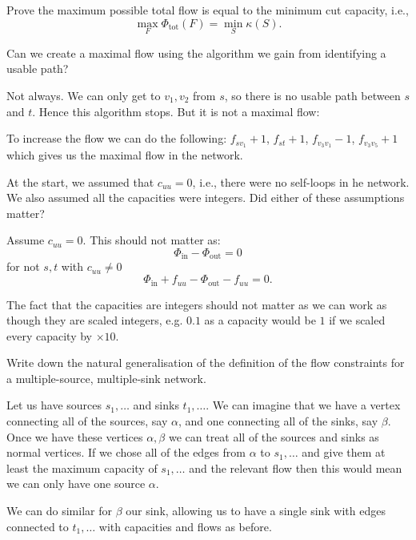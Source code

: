 \documentclass[10pt, a4paper]{article}
\begin{document}
\begin{example}
    Prove the maximum possible total flow is equal to the minimum cut capacity,
    i.e.,
    \[
    \max_{F}\Phi_{\text{tot}}(F) = \min_{S}\kappa(S).
    \]
\end{example}

\begin{example}
    Can we create a maximal flow using the algorithm we gain from identifying a usable path?

    \begin{solution}
        Not always.
        We can only get to $v_1, v_2$ from $s$,
        so there is no usable path between $s$ and $t$.
        Hence this algorithm stops.
        But it is not a maximal flow:

        To increase the flow we can do the following:
        $f_{sv_1} + 1$,
        $f_{st} + 1$,
        $f_{v_3v_1} - 1$,
        $f_{v_3v_5} + 1$ which gives us the maximal flow in the network.
    \end{solution}
\end{example}

\begin{example}
    At the start,
    we assumed that $c_{uu} = 0$,
    i.e.,
    there were no self-loops in he network.
    We also assumed all the capacities were integers.
    Did either of these assumptions matter?

    \begin{solution}
        Assume $c_{uu} = 0$.
        This should not matter as:
        \[
        \Phi_{\text{in}} - \Phi_{\text{out}} = 0
        \]
        for not $s, t$ with $c_{uu} \neq 0$
        \[
        \Phi_{\text{in}} + f_{uu} - \Phi_{\text{out}} - f_{uu} = 0.
        \]

        The fact that the capacities are integers should not matter as we can work as though they are scaled integers,
        e.g. $0.1$ as a capacity would be $1$ if we scaled every capacity by $\times 10$.
    \end{solution}
\end{example}

\begin{example}
    Write down the natural generalisation of the definition of the flow constraints for a multiple-source,
    multiple-sink network.

    \begin{solution}
        Let us have sources $s_1, \dotsc$ and sinks $t_1, \dotsc$.
        We can imagine that we have a vertex connecting all of the sources,
        say $\alpha$,
        and one connecting all of the sinks,
        say $\beta$.
        Once we have these vertices $\alpha, \beta$ we can treat all of the sources and sinks as normal vertices.
        If we chose all of the edges from $\alpha$ to $s_1, \dotsc$ and give them at least the maximum capacity of $s_1, \dotsc$ and the relevant flow then this would mean we can only have one source $\alpha$.

        We can do similar for $\beta$ our sink,
        allowing us to have a single sink with edges connected to $t_1, \dotsc$ with capacities and flows as before.
    \end{solution}
\end{example}
\end{document}
